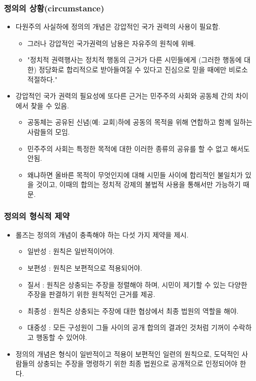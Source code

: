 \documentclass[aspectratio=169,xcolor=dvipsnames,handout]{beamer}
\begin{document}
\begin{frame}[<+->]
\frametitle{정의의 상황(circumstance)}
    \begin{itemize}
        \item 다원주의 사실하에 정의의 개념은 강압적인 국가 권력의 사용이 필요함.
        \begin{itemize}
            \item  그러나 강압적인 국가권력의 남용은 자유주의 원칙에 위배.
            \item  "정치적 권력행사는 정치적 행동의 근거가 다른 시민들에게 (그러한 행동에 대한) 정당화로 합리적으로 받아들여질 수 있다고 진심으로 믿을 때에만 비로소 적절하다."
        \end{itemize}
    \item 강압적인 국가 권력의 필요성에 또다른 근거는 민주주의 사회와 공동체 간의 차이에서 찾을 수 있음.
    \begin{itemize}
        \item 공동체는 공유된 신념(예: 교회)하에 공동의 목적을 위해 연합하고 함께 일하는 사람들의 모임.
        \item 민주주의 사회는 특정한 목적에 대한 이러한 종류의 공유를 할 수 없고 해서도 안됨.
        \item 왜냐하면 올바른 목적이 무엇인지에 대해 시민들 사이에 합리적인 불일치가 있을 것이고, 이때의 합의는 정치적 강제의 불법적 사용을 통해서만 가능하기 때문.
    \end{itemize}
    \end{itemize}
\end{frame}

\begin{frame}[<+->]
\frametitle{정의의 형식적 제약}
    \begin{itemize}
        \item  롤즈는 정의의 개념이 충족해야 하는 다섯 가지 제약을 제시.
        \begin{itemize}
            \item  일반성 : 원칙은 일반적이어야. 
            \item  보편성 : 원칙은 보편적으로 적용되어야.
            \item  질서 : 원칙은 상충되는 주장을 정렬해야 하며, 시민이 제기할 수 있는 다양한 주장을 판결하기 위한 원칙적인 근거를 제공. 
            \item  최종성 : 원칙은 상충되는 주장에 대한 협상에서 최종 법원의 역할을 해야.
            \item  대중성 : 모든 구성원이 그들 사이의 공개 합의의 결과인 것처럼 기꺼이 수락하고 행동할 수 있어야.
        \end{itemize}
        \item  정의의 개념은 형식이 일반적이고 적용이 보편적인 일련의 원칙으로, 도덕적인 사람들의 상충되는 주장을 명령하기 위한 최종 법원으로 공개적으로 인정되어야 한다.
    \end{itemize}
\end{frame}
\end{document}
